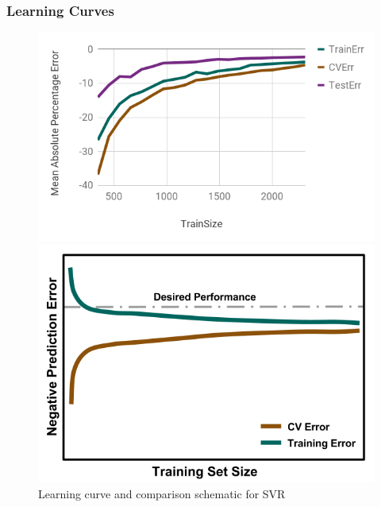 
\begin{frame}
  \frametitle{Learning Curves}
  \begin{figure}
    \begin{minipage}{0.65\textwidth}
      \centering
      \includegraphics[width=\linewidth]{./figures/lc1.png}
    \end{minipage}%
    \begin{minipage}{0.35\textwidth}
      \centering
      \includegraphics[width=\linewidth]{./figures/NegLearningCurve-ideal.png}
    \end{minipage}
    \caption{Learning curve and comparison schematic for SVR}
  \end{figure}
\end{frame}

